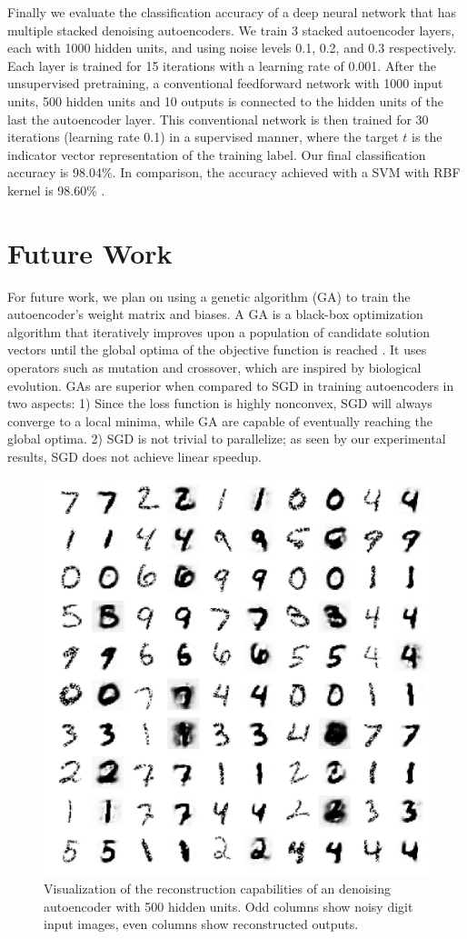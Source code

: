 \documentclass[conference]{IEEEtran}
\begin{document}
Finally we evaluate the classification accuracy of a deep neural network that has multiple stacked denoising autoencoders. We train 3 stacked autoencoder layers, each with 1000 hidden units, and using noise levels 0.1, 0.2, and 0.3 respectively. Each layer is trained for 15 iterations with a learning rate of 0.001. After the unsupervised pretraining, a conventional feedforward network with 1000 input units, 500 hidden units and 10 outputs is connected to the hidden units of the last the autoencoder layer. This conventional network is then trained for 30 iterations (learning rate 0.1) in a supervised manner, where the target $t$ is the indicator vector representation of the training label. Our final classification accuracy is 98.04\%. In comparison, the accuracy achieved with a SVM with RBF kernel is 98.60\% \cite{vincent2010stacked}. 

\section{Future Work}
For future work, we plan on using a genetic algorithm (GA) to train the autoencoder's weight matrix and biases. A GA is a black-box optimization algorithm that iteratively improves upon a population of candidate solution vectors until the global optima of the objective function is reached \cite{srinivas1994genetic}. It uses operators such as mutation and crossover, which are inspired by biological evolution. GAs are superior when compared to SGD in training autoencoders in two aspects: 1) Since the loss function is highly nonconvex, SGD will always converge to a local minima, while GA are capable of eventually reaching the global optima. 2) SGD is not trivial to parallelize; as seen by our experimental results, SGD does not achieve linear speedup. 

\begin{figure}[h]
\centering
\includegraphics[width=0.8\linewidth]{experiment3_2.png}
\caption{Visualization of the reconstruction capabilities of an denoising autoencoder with 500 hidden units. Odd columns show noisy digit input images, even columns show reconstructed outputs.}
\label{fig:experiment3_2}
\end{figure}
\end{document}
